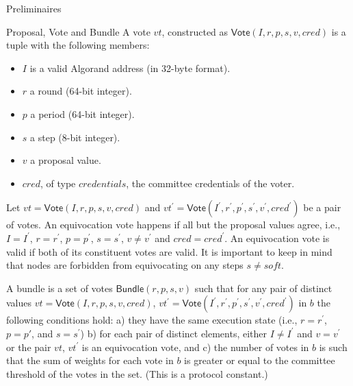 \documentclass[10pt,a4paper]{article}
\begin{document}
\begin{section}{Preliminaires}
\begin{subsection}{Proposal, Vote and Bundle}
A vote $vt$, constructed as $\mathsf{Vote}(I,r,p,s,v,cred)$ is a tuple with the following members:
\begin{itemize}
    \item $I$ is a valid Algorand address (in 32-byte format).
    \item $r$ a round (64-bit integer).
    \item $p$ a period (64-bit integer).
    \item $s$ a step (8-bit integer).
    \item $v$ a proposal value.
    \item $cred$, of type $credentials$, the committee credentials of the voter.
\end{itemize}


Let 
  $vt=\mathsf{Vote}(I, r, p, s, v, cred)$ and 
  $vt^\prime=\mathsf{Vote}(I^\prime, r^\prime, p^\prime, s^\prime, v^\prime, cred^\prime)$ be a pair of votes.
An {\sf equivocation vote} happens 
if all but the proposal values agree, i.e., $I=I^\prime$, $r=r^\prime$, $p=p^\prime$,
$s=s^\prime$, $v\neq v^\prime$ and $cred=cred^\prime$.
An equivocation vote is valid if both of its constituent votes are valid.
It is important to keep in mind that nodes are forbidden from equivocating 
on any steps $s \neq soft$.

A {\sf bundle} is a set of votes $\mathsf{Bundle}(r,p,s,v)$ such that for any pair of distinct values 
$vt=\mathsf{Vote}(I, r, p, s, v, cred)$,
$vt^\prime=\mathsf{Vote}(I^\prime, r^\prime, p^\prime, s^\prime, v^\prime, cred^\prime)$ in $b$ 
the following conditions hold: 
a) they have the same execution state (i.e., $r = r^\prime$, $p=p\prime$,
and $s=s^\prime$)
b) for each pair of distinct elements, either $I\neq I^\prime$ and $v=v^\prime$ 
  or the pair $vt$, $vt^\prime$ is an equivocation vote, and
c) the number of votes in $b$ is such that the sum of weights for each vote in $b$ is greater or equal to the
committee threshold of the votes in the set. (This is a protocol constant.)


\end{subsection}
\end{section}
\end{document}
